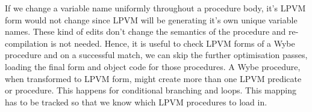 If we change a variable name uniformly throughout a procedure body, it's LPVM
form would not change since LPVM will be generating it's own unique variable
names. These kind of edits don't change the semantics of the procedure and
re-compilation is not needed. Hence, it is useful to check LPVM forms of a Wybe
procedure and on a successful match, we can skip the further optimisation
passes, loading the final form and object code for those procedures. A Wybe
procedure, when transformed to LPVM form, might create more than one LPVM
predicate or procedure. This happens for conditional branching and loops. This
mapping has to be tracked so that we know which LPVM procedures to load in.

